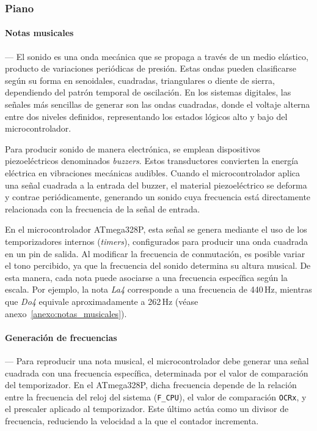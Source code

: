     \vspace{1em}
    


\subsubsection{\textbf{Piano}}
    \paragraph*{\textbf{Notas musicales}}---
    El sonido es una onda mecánica que se propaga a través de un medio elástico, producto de variaciones periódicas de presión. Estas ondas pueden clasificarse según su forma en senoidales, cuadradas, triangulares o diente de sierra, dependiendo del patrón temporal de oscilación. En los sistemas digitales, las señales más sencillas de generar son las ondas cuadradas, donde el voltaje alterna entre dos niveles definidos, representando los estados lógicos alto y bajo del microcontrolador.

    \vspace{1em}

    Para producir sonido de manera electrónica, se emplean dispositivos piezoeléctricos denominados \textit{buzzers}. Estos transductores convierten la energía eléctrica en vibraciones mecánicas audibles. Cuando el microcontrolador aplica una señal cuadrada a la entrada del buzzer, el material piezoeléctrico se deforma y contrae periódicamente, generando un sonido cuya frecuencia está directamente relacionada con la frecuencia de la señal de entrada.

    \vspace{1em}

    En el microcontrolador ATmega328P, esta señal se genera mediante el uso de los temporizadores internos (\textit{timers}), configurados para producir una onda cuadrada en un pin de salida. Al modificar la frecuencia de conmutación, es posible variar el tono percibido, ya que la frecuencia del sonido determina su altura musical. De esta manera, cada nota puede asociarse a una frecuencia específica según la escala. Por ejemplo, la nota \textit{La4} corresponde a una frecuencia de 440\,Hz, mientras que \textit{Do4} equivale aproximadamente a 262\,Hz (véase anexo~\ref{anexo:notas_musicales}).


    \vspace{1em}

    \paragraph*{\textbf{Generación de frecuencias}}---
    Para reproducir una nota musical, el microcontrolador debe generar una señal cuadrada con una frecuencia específica, determinada por el valor de comparación del temporizador. En el ATmega328P, dicha frecuencia depende de la relación entre la frecuencia del reloj del sistema (\texttt{F\_CPU}), el valor de comparación \texttt{OCRx}, y el prescaler aplicado al temporizador. Este último actúa como un divisor de frecuencia, reduciendo la velocidad a la que el contador incrementa.
    
